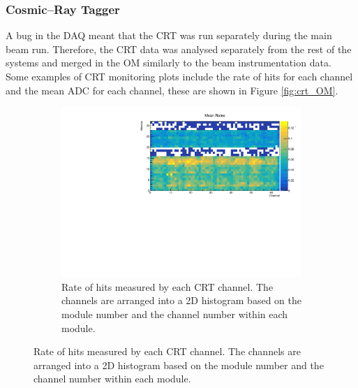 \subsubsection*{Cosmic--Ray Tagger}
A bug in the DAQ meant that the CRT was run separately during the main beam 
run. Therefore, the CRT data was analysed separately from the rest of the 
\protodune{} systems and merged in the OM similarly to the beam instrumentation 
data. Some examples of CRT monitoring plots include the rate of hits for each 
channel and the mean ADC for each channel, these are shown in Figure 
\ref{fig:crt_OM}.

\begin{figure}

	\centering

	\begin{subfigure}[b]{0.8\textwidth}
		\centering
		\vspace{3mm}
		\includegraphics[width=\textwidth]{figures/crt_rate_om.pdf}
		\caption {Rate of hits measured by each CRT channel. The channels are
		arranged into a 2D histogram based on the module number and the channel
		number within each module.}
		\label{fig:crt_rate_om}
	\end{subfigure}


\end{figure}
